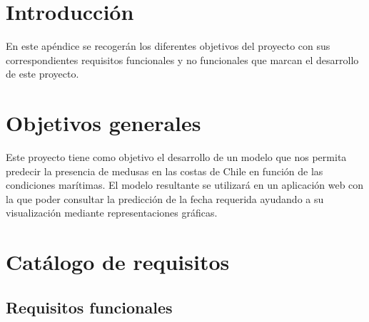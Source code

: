 
\section{Introducción}
En este apéndice se recogerán los diferentes objetivos del proyecto con sus correspondientes requisitos funcionales y no funcionales que marcan el desarrollo de este proyecto.

\section{Objetivos generales}

Este proyecto tiene como objetivo el desarrollo de un modelo que nos permita predecir la presencia de medusas en las costas de Chile en función de las condiciones marítimas. El modelo resultante se utilizará en un aplicación web con la que poder consultar la predicción de la fecha requerida ayudando a su visualización mediante representaciones gráficas.

\section{Catálogo de requisitos}

	\subsection{Requisitos funcionales}

